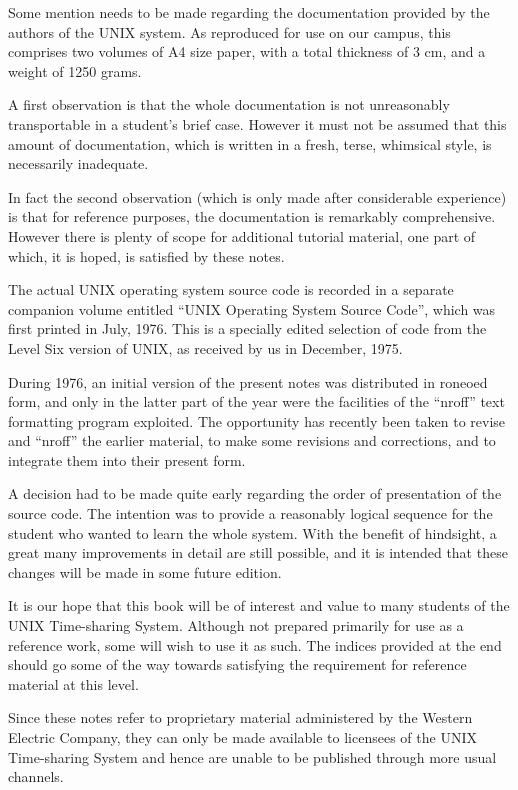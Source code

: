 Some mention needs to be made regarding
the documentation provided by the
authors of the UNIX system. As reproduced for use on our campus, this
comprises two volumes of A4 size paper,
with a total thickness of 3 cm, and a
weight of 1250 grams.

A first observation is that the whole
documentation is not unreasonably transportable in a student's brief case.
However it must not be assumed that
this amount of documentation, which is
written in a fresh, terse, whimsical
style, is necessarily inadequate.

In fact the second observation (which
is only made after considerable experience) is that for reference purposes,
the documentation is remarkably
comprehensive. However there is plenty
of scope for additional tutorial
material, one part of which, it is
hoped, is satisfied by these notes.

The actual UNIX operating system source
code is recorded in a separate companion volume entitled ``UNIX Operating
System Source Code'', which was first
printed in July, 1976. This is a specially edited selection of code from
the Level Six version of UNIX, as
received by us in December, 1975.

During 1976, an initial version of the
present notes was distributed in
roneoed form, and only in the latter
part of the year were the facilities of
the ``nroff'' text formatting program
exploited. The opportunity has
recently been taken to revise and
``nroff'' the earlier material, to make
some revisions and corrections, and to
integrate them into their present form.

A decision had to be made quite early
regarding the order of presentation of
the source code. The intention was to
provide a reasonably logical sequence
for the student who wanted to learn the
whole system. With the benefit of
hindsight, a great many improvements in
detail are still possible, and it is
intended that these changes will be
made in some future edition.

It is our hope that this book will be
of interest and value to many students
of the UNIX Time-sharing System.
Although not prepared primarily for use
as a reference work, some will wish to
use it as such. The indices provided at
the end should go some of the way
towards satisfying the requirement for
reference material at this level.

Since these notes refer to proprietary
material administered by the Western
Electric Company, they can only be made
available to licensees of the UNIX
Time-sharing System and hence are
unable to be published through more
usual channels.

